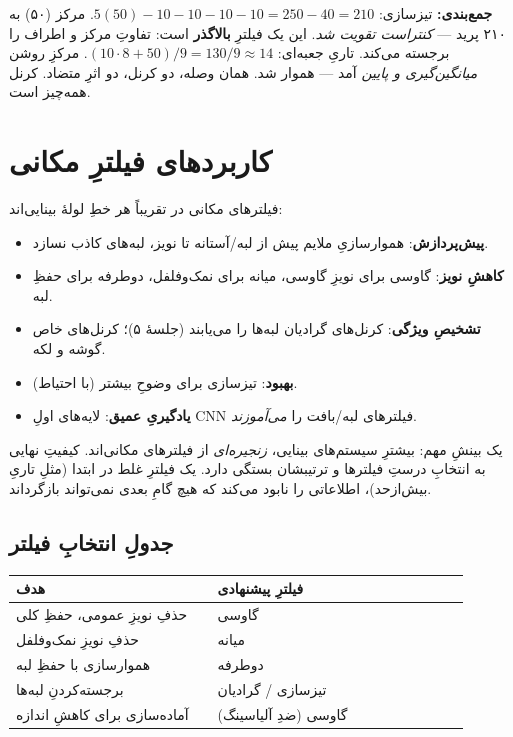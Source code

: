 \documentclass[12pt,a4paper]{article}
\begin{document}
\textbf{جمع‌بندی:} تیزسازی: $5(50) - 10 - 10 - 10 - 10 = 250 - 40 = 210$. مرکز (۵۰) به ۲۱۰ پرید —
\emph{کنتراست تقویت شد}. این یک فیلترِ \textbf{بالاگذر} است: تفاوتِ مرکز و اطراف را برجسته می‌کند.
تاریِ جعبه‌ای: $(10{\cdot}8 + 50)/9 = 130/9 \approx 14$. مرکزِ روشن \emph{میانگین‌گیری و پایین}
آمد — هموار شد. همان وصله، دو کرنل، دو اثرِ متضاد. کرنل همه‌چیز است.

\section{کاربردهای فیلترِ مکانی}

فیلترهای مکانی در تقریباً هر خطِ لولهٔ بینایی‌اند:

\begin{itemize}
  \item \textbf{پیش‌پردازش}: هموارسازیِ ملایم پیش از لبه/آستانه تا نویز، لبه‌های کاذب نسازد.
  \item \textbf{کاهشِ نویز}: گاوسی برای نویزِ گاوسی، میانه برای نمک‌وفلفل، دوطرفه برای حفظِ لبه.
  \item \textbf{تشخیصِ ویژگی}: کرنل‌های گرادیان لبه‌ها را می‌یابند (جلسهٔ ۵)؛ کرنل‌های خاص گوشه و لکه.
  \item \textbf{بهبود}: تیزسازی برای وضوحِ بیشتر (با احتیاط).
  \item \textbf{یادگیریِ عمیق}: لایه‌های اولِ CNN فیلترهای لبه/بافت را \emph{می‌آموزند}.
\end{itemize}

\begin{yaddasht}
یک بینشِ مهم: بیشترِ سیستم‌های بینایی، \emph{زنجیره‌ای} از فیلترهای مکانی‌اند. کیفیتِ نهایی به
انتخابِ درستِ فیلترها و ترتیبشان بستگی دارد. یک فیلترِ غلط در ابتدا (مثلِ تاریِ بیش‌ازحد)،
اطلاعاتی را نابود می‌کند که هیچ گامِ بعدی نمی‌تواند بازگرداند.
\end{yaddasht}

\subsection{جدولِ انتخابِ فیلتر}

\begin{center}
\begin{tabular}{>{\raggedright\arraybackslash}p{0.4\linewidth} >{\raggedright\arraybackslash}p{0.5\linewidth}}
\toprule
\textbf{هدف} & \textbf{فیلترِ پیشنهادی} \\
\midrule
حذفِ نویزِ عمومی، حفظِ کلی & گاوسی \\
حذفِ نویزِ نمک‌وفلفل & میانه \\
هموارسازی با حفظِ لبه & دوطرفه \\
برجسته‌کردنِ لبه‌ها & تیزسازی / گرادیان \\
آماده‌سازی برای کاهشِ اندازه & گاوسی (ضدِ آلیاسینگ) \\
\bottomrule
\end{tabular}
\end{center}
\end{document}
